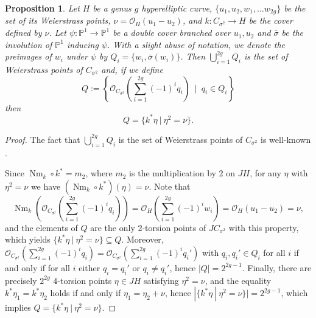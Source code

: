 \documentclass{article}
\newtheorem{thm}{Theorem}[section]
\newtheorem{prop}[thm]{Proposition}
\numberwithin{equation}{section}
\newcommand{\tC}{\Tilde{C}}
\DeclareMathOperator{\Nm}{Nm}
\begin{document}

\begin{prop}
\label{bundles}
    Let $H$ be a genus $g$ hyperelliptic curve, $\{u_1, u_2, w_1, \ldots w_{2g}\}$ be the set of its Weierstrass points, $\nu = \mathcal{O}_H(u_1-u_2)$, and $k: C_{\sigma^2} \to H$ be the cover defined by $\nu$. Let $\psi: \mathbb{P}^1 \to \mathbb{P}^1$ be a double cover branched over $u_1, u_2$ and $\bar{\sigma}$ be the involution of $\mathbb{P}^1$ inducing $\psi$. With a slight abuse of notation, we denote the preimages of $w_i$ under $\psi$ by $Q_i = \{w_i, \bar\sigma(w_i)\}$. 
    Then $ \bigcup_{i=1}^{2g} Q_i$ is the set of Weierstrass points of $C_{\sigma^2}$ and, if we define $$Q := \left\{\mathcal{O}_{C_{\sigma^2}}\left(\sum_{i=1}^{2g}(-1)^iq_i\right) \ \mid \ q_i \in Q_i\right\}$$ then $$Q = \{k^*\eta \ | \ \eta^2 = \nu\}.$$
\end{prop}

\begin{proof}
    The fact that $ \bigcup_{i=1}^{2g} Q_i$ is the set of Weierstrass points of $C_{\sigma^2}$ is well-known \cite[Corollary 4.3]{BO17}. 
    
    Since $\Nm_{k}\circ k^* = m_2$, where $m_2$ is the multiplication by $2$ on $JH$, for any $\eta$ with $\eta^2 = \nu$ we have $(\Nm_{k}\circ k^*)(\eta) = \nu$. Note that $$\Nm_k\left(\mathcal{O}_{C_{\sigma^2}}\left(\sum_{i=1}^{2g}(-1)^iq_i\right)\right) = \mathcal{O}_H\left(\sum_{i=1}^{2g}(-1)^iw_i\right) = \mathcal{O}_H(u_1 - u_2) = \nu,$$ and the elements of $Q$ are the only 2-torsion points of $JC_{\sigma^2}$ with this property, which yields $\{k^*\eta \: | \: \eta^2 = \nu\} \subseteq Q$.
Moreover, $\mathcal{O}_{C_{\sigma^2}}(\sum_{i=1}^{2g}(-1)^iq_i) = \mathcal{O}_{C_{\sigma^2}}\left(\sum_{i=1}^{2g}(-1)^iq_i'\right)$ with $q_i, q_i' \in Q_i$ for all $i$ if and only if for all $i$ either $q_i = q_i'$ or $q_i \neq q_i'$, hence $|Q| = 2^{2g-1}$. Finally, there are precisely $2^{2g}$ 4-torsion points $\eta \in JH$ satisfying $\eta^2 = \nu$, and the equality $k^*\eta_1 = k^*\eta_2$ holds if and only if $\eta_1 = \eta_2 + \nu$, hence $|\{k^*\eta \ | \ \eta^2 = \nu\}| = 2^{2g-1}$, which implies $Q = \{k^*\eta \: | \: \eta^2 = \nu\}$.
\end{proof}
\end{document}
